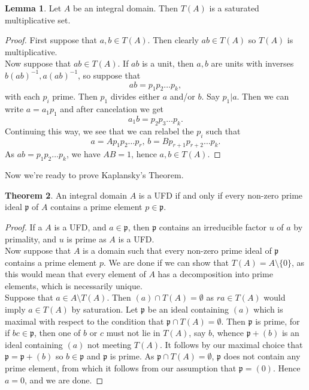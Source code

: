 \documentclass{article}
\theoremstyle{definition}
\newtheorem{theorem}{Theorem}[section]
\newtheorem{lemma}[theorem]{Lemma}
\begin{document}
\begin{lemma}
	Let $A$ be an integral domain. Then $T(A)$ is a saturated multiplicative
	set.
\end{lemma}
\begin{proof}
	First suppose that $a, b \in T(A)$. Then clearly $ab \in T(A)$ so $T(A)$
	is multiplicative. \\

	Now suppose that $ab \in T(A)$. If $ab$ is a unit, then $a, b$ are units
	with inverses $b(ab)^{-1}, a(ab)^{-1}$, so suppose that
	\[
		ab = p_1p_2 \ldots p_k,
	\]
	with each $p_i$ prime. Then $p_1$ divides either $a$ and/or $b$.
	Say $p_1 | a$. Then we can write $a = a_1 p_1$ and after cancelation
	we get
	\[
		a_1 b = p_2 p_3 \ldots p_k.
	\]
	Continuing this way, we see that we can relabel the $p_i$ such that
	\[
		a = A p_1 p_2 \ldots p_r, \,
		b = B p_{r + 1} p_{r + 2} \ldots p_k.
	\]
	As $ab = p_1 p_2 \ldots p_k$, we have $AB = 1$,
	hence $a, b \in T(A)$.
\end{proof}

Now we're ready to prove Kaplansky's Theorem.

\begin{theorem}
	An integral domain $A$ is a UFD if and only if every non-zero prime ideal
	$\mathfrak{p}$ of $A$ contains a prime element $p \in \mathfrak{p}$.
\end{theorem}
\begin{proof}
	If a $A$ is a UFD, and $a \in \mathfrak{p}$, then $\mathfrak{p}$ contains
	an irreducible factor $u$ of $a$ by primality, and $u$ is prime as $A$ is a
	UFD. \\

	Now suppose that $A$ is a domain such that every non-zero prime ideal of
	$\mathfrak{p}$ contains a prime element $p$. We are done if we can show
	that $T(A) = A \setminus \{0\}$, as this would mean that every element of
	$A$ has a decomposition into prime elements, which is necessarily unique.
	\\

	Suppose that $a \in A \setminus T(A)$. Then $(a) \cap T(A) = \emptyset$ as
	$ra \in T(A)$ would imply $a \in T(A)$ by saturation. Let $\mathfrak{p}$ be
	an ideal containing $(a)$ which is maximal with respect to the condition
	that $\mathfrak{p} \cap T(A) = \emptyset$. Then $\mathfrak{p}$ is prime,
	for if $bc \in \mathfrak{p}$, then one of $b$ or $c$ must not lie in
	$T(A)$, say $b$, whence $\mathfrak{p} + (b)$ is an ideal containing
	$(a)$ not meeting $T(A)$. It follows by our maximal choice that
	$\mathfrak{p} = \mathfrak{p} + (b)$ so $b \in \mathfrak{p}$ and
	$\mathfrak{p}$ is prime. As $\mathfrak{p} \cap T(A) = \emptyset$,
	$\mathfrak{p}$ does not contain any prime element, from which it follows
	from our assumption that $\mathfrak{p} = (0)$. Hence $a = 0$, and we are
	done.

\end{proof}
\end{document}

